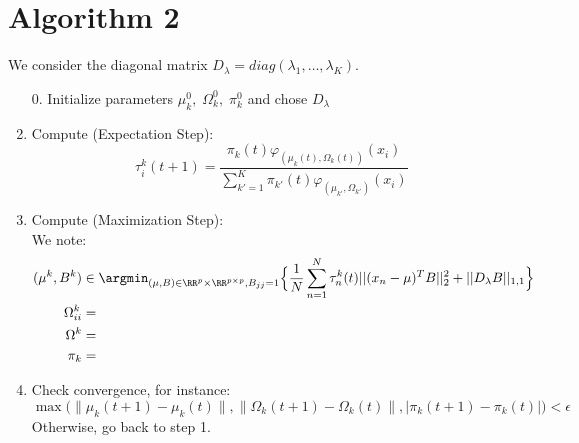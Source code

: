 \section{Algorithm 2}

We consider the diagonal matrix $D_{\lambda}=diag(\lambda_1,\dots,\lambda_K)$.

\begin{enumerate}
	\item[0.] Initialize parameters $\mu_k^0,\; \Omega_k^0,\;\pi_k^0$ and chose $D_{\lambda}$
	\item Compute (Expectation Step):
	      \begin{equation}
	      	\tau_i^k(t+1)=\frac{\pi_k(t) \varphi_{(\mu_k(t),\Omega_k(t))}(x_i)}{\sum_{k'=1}^K\pi_{k'}(t)\varphi_{(\mu_{k'},\Omega_{k'})}(x_i)}
	      \end{equation}
	\item Compute (Maximization Step):\\
	      We note:
	      \begin{align}
	      	(\mu^k,B^k)   & \in \argmin_{(\mu,B)\in \RR^p \times \RR^{p\times p},B_{jj}=1}\Big\{\frac{1}{N}\sum_{n=1}^N\tau_n^k(t)||(x_n-\mu)^TB||^2_2+||D_{\lambda}B||_{1,1}\Big\} \\
	      	\Omega^k_{ii} & =                                                                                                                                                       \\
	      	\Omega^k      & =                                                                                                                                                       \\
	      	\pi_k         & =
	      \end{align}
	\item Check convergence, for instance:\\
	      $\max\Big(\|\mu_k(t+1)-\mu_k(t)\|,\|\Omega_k(t+1)-\Omega_k(t)\|,|\pi_k(t+1)-\pi_k(t)|\Big)<\epsilon$
	      Otherwise, go back to step 1.
\end{enumerate}

\item
